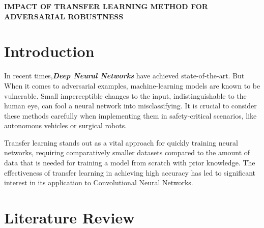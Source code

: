 \documentclass{article}
\begin{document}
\begin{center}
    \Large \bfseries{IMPACT OF TRANSFER LEARNING METHOD FOR ADVERSARIAL ROBUSTNESS}
\end{center}

\section{Introduction}
In recent times,\textbf{\textit{Deep Neural Networks}} have achieved state-of-the-art.\cite{NIPS2012_c399862d} But When it comes to adversarial examples, machine-learning models are known to be vulnerable. Small imperceptible changes to the input, indistinguishable to the human eye, can fool a neural network into misclassifying. It is crucial to consider these methods carefully when implementing them in safety-critical scenarios, like autonomous vehicles or surgical robots. \cite{WardeFarley20161AP} \cite{yuan2018adversarial}

\setlength{\parskip}{10pt}
\begingroup
\raggedright
Transfer learning stands out as a vital approach for quickly training neural networks, requiring comparatively smaller datasets compared to the amount of data that is needed for training a model from scratch with prior knowledge. The effectiveness of transfer learning in achieving high accuracy has led to significant interest in its application to Convolutional Neural Networks. 
\endgroup

\section{Literature Review}
\end{document}
